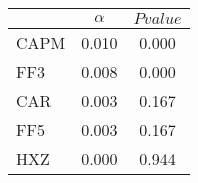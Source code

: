 \begin{tabular}{lcc}
\toprule
 & $\alpha$ & $Pvalue$ \\
\midrule
CAPM & 0.010 & 0.000 \\
FF3 & 0.008 & 0.000 \\
CAR & 0.003 & 0.167 \\
FF5 & 0.003 & 0.167 \\
HXZ & 0.000 & 0.944 \\
\bottomrule
\end{tabular}
